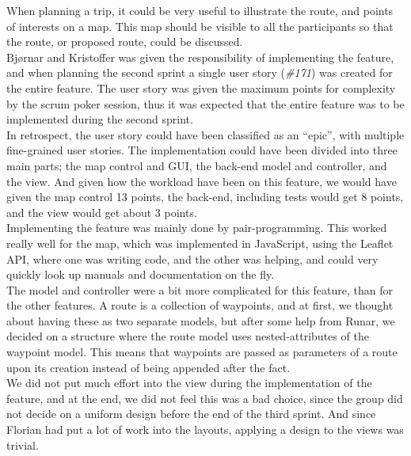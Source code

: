 \documentclass[a4paper]{article}
\begin{document}
\noindent
When planning a trip, it could be very useful to illustrate the route, and points of interests on a map. This map should be visible to all the participants so that the route, or proposed route, could be discussed.\\

\noindent
Bjørnar and Kristoffer was given the responsibility of implementing the feature, and when planning the second sprint a single user story (\emph{\#171}) was created for the entire feature. The user story was given the maximum points for complexity by the scrum poker session, thus it was expected that the entire feature was to be implemented during the second sprint. \\

\noindent
In retrospect, the user story could have been classified as an “epic”, with multiple fine-grained user stories. The implementation could have been divided into three main parts; the map control and GUI, the back-end model and controller, and the view. And given how the workload have been on this feature, we would have given the map control 13 points, the back-end, including tests would get 8 points, and the view would get about 3 points. \\

\noindent
Implementing the feature was mainly done by pair-programming. This worked really well for the map, which was implemented in JavaScript, using the Leaflet API, where one was writing code, and the other was helping, and could very quickly look up manuals and documentation on the fly. \\

\noindent
The model and controller were a bit more complicated for this feature, than for the other features. A route is a collection of waypoints, and at first, we thought about having these as two separate models, but after some help from Runar, we decided on a structure where the route model uses nested-attributes of the waypoint model. This means that waypoints are passed as parameters of a route upon its creation instead of being appended after the fact. \\

\noindent
We did not put much effort into the view during the implementation of the feature, and at the end, we did not feel this was a bad choice, since the group did not decide on a uniform design before the end of the third sprint. And since Florian had put a lot of work into the layouts, applying a design to the views was trivial. \\
\end{document}
